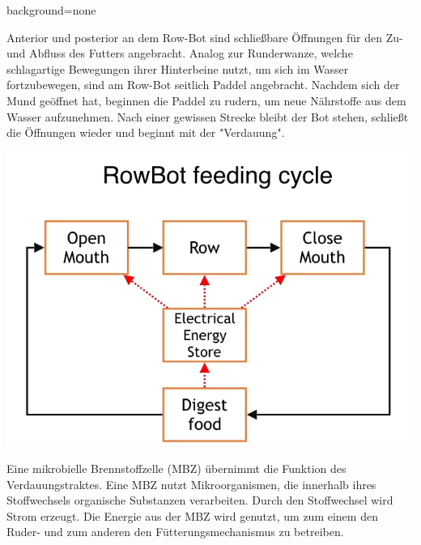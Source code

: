 \documentclass[landscape,a0paper,fontscale=0.32]{baposter}
\begin{document}
\begin{poster}{background=none}
{\begin{multicols}{2}
				\hspace{0.5em}

				Anterior und posterior an dem Row-Bot sind schließbare Öffnungen für den Zu- und Abfluss des Futters angebracht. Analog zur Runderwanze, welche schlagartige Bewegungen ihrer Hinterbeine nutzt, um sich im Wasser fortzubewegen, sind am Row-Bot seitlich Paddel angebracht. Nachdem sich der Mund geöffnet hat, beginnen die Paddel zu rudern, um neue Nährstoffe aus dem Wasser aufzunehmen. Nach einer gewissen Strecke bleibt der Bot stehen, schließt die Öffnungen wieder und beginnt mit der "Verdauung".

				\columnbreak
				
				\begin{minipage}{1\linewidth}
					\centering
					\includegraphics[width=0.9\linewidth]{pics/bewegungsablauf.PNG}
				\end{minipage}

				Eine mikrobielle Brennstoffzelle (MBZ) übernimmt die Funktion des Verdauungstraktes. Eine MBZ nutzt Mikroorganismen, die innerhalb ihres Stoffwechsels organische Substanzen verarbeiten. Durch den Stoffwechsel wird Strom erzeugt. Die Energie aus der MBZ wird genutzt, um zum einem den Ruder- und zum anderen den Fütterungsmechanismus zu betreiben.

				\hspace{0.5em}


\end{multicols}}
\end{poster}
\end{document}
